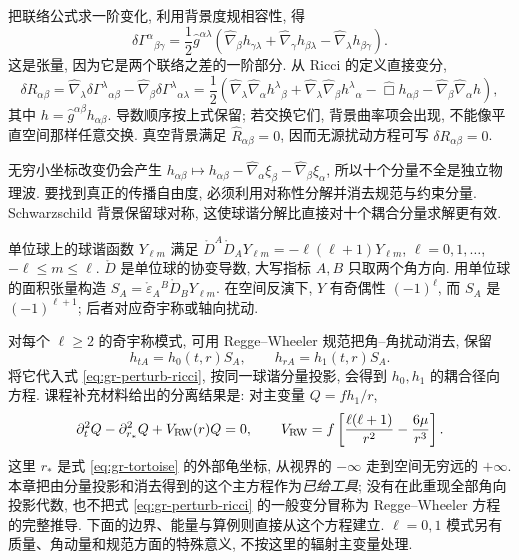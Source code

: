 把联络公式求一阶变化, 利用背景度规相容性, 得
\begin{equation}
 \delta\Gamma^\alpha{}_{\beta\gamma}
 =\frac12\widehat g^{\alpha\lambda}
  (\widehat\nabla_\beta h_{\gamma\lambda}
    +\widehat\nabla_\gamma h_{\beta\lambda}
    -\widehat\nabla_\lambda h_{\beta\gamma}).
 \label{eq:gr-perturb-gamma}
\end{equation}
这是张量, 因为它是两个联络之差的一阶部分. 从 Ricci 的定义直接变分,
\begin{equation}
 \delta R_{\alpha\beta}
   =\widehat\nabla_\lambda\delta\Gamma^\lambda{}_{\alpha\beta}
     -\widehat\nabla_\beta\delta\Gamma^\lambda{}_{\alpha\lambda}
   =\frac12\left(
      \widehat\nabla_\lambda\widehat\nabla_\alpha h^\lambda{}_\beta
     +\widehat\nabla_\lambda\widehat\nabla_\beta h^\lambda{}_\alpha
     -\widehat\Box h_{\alpha\beta}
     -\widehat\nabla_\beta\widehat\nabla_\alpha h\right),
 \label{eq:gr-perturb-ricci}
\end{equation}
其中 $h=\widehat g^{\alpha\beta}h_{\alpha\beta}$. 导数顺序按上式保留; 若交换它们, 背景曲率项会出现, 不能像平直空间那样任意交换. 真空背景满足 $\widehat R_{\alpha\beta}=0$, 因而无源扰动方程可写 $\delta R_{\alpha\beta}=0$.

无穷小坐标改变仍会产生 $h_{\alpha\beta}\mapsto h_{\alpha\beta}-\widehat\nabla_\alpha\xi_\beta-\widehat\nabla_\beta\xi_\alpha$, 所以十个分量不全是独立物理波. 要找到真正的传播自由度, 必须利用对称性分解并消去规范与约束分量. Schwarzschild 背景保留球对称, 这使球谐分解比直接对十个耦合分量求解更有效.


单位球上的球谐函数 $Y_{\ell m}$ 满足 $\mathring D^A\mathring D_A Y_{\ell m}=-\ell(\ell+1)Y_{\ell m}$, $\ell=0,1,\ldots$, $-\ell\le m\le\ell$. $\mathring D$ 是单位球的协变导数, 大写指标 $A,B$ 只取两个角方向. 用单位球的面积张量构造 $S_A=\mathring\varepsilon_A{}^B\mathring D_B Y_{\ell m}$. 在空间反演下, $Y$ 有奇偶性 $(-1)^\ell$, 而 $S_A$ 是 $(-1)^{\ell+1}$; 后者对应奇宇称或轴向扰动.

对每个 $\ell\ge2$ 的奇宇称模式, 可用 Regge--Wheeler 规范把角--角扰动消去, 保留
\[
 h_{tA}=h_0(t,r)S_A,\qquad h_{rA}=h_1(t,r)S_A.
\]
将它代入式 \eqref{eq:gr-perturb-ricci}, 按同一球谐分量投影, 会得到 $h_0,h_1$ 的耦合径向方程. 课程补充材料给出的分离结果是: 对主变量 $Q=f h_1/r$,
\begin{equation}
 \partial_t^2Q-\partial_{r_*}^2Q+V_{\rm RW}(r)Q=0,\qquad
 V_{\rm RW}=f\left[\frac{\ell(\ell+1)}{r^2}-\frac{6\mu}{r^3}\right].
 \label{eq:gr-rw}
\end{equation}
这里 $r_*$ 是式 \eqref{eq:gr-tortoise} 的外部龟坐标, 从视界的 $-\infty$ 走到空间无穷远的 $+\infty$. 本章把由分量投影和消去得到的这个主方程作为\emph{已给工具}; 没有在此重现全部角向投影代数, 也不把式 \eqref{eq:gr-perturb-ricci} 的一般变分冒称为 Regge--Wheeler 方程的完整推导. 下面的边界、能量与算例则直接从这个方程建立. $\ell=0,1$ 模式另有质量、角动量和规范方面的特殊意义, 不按这里的辐射主变量处理.

